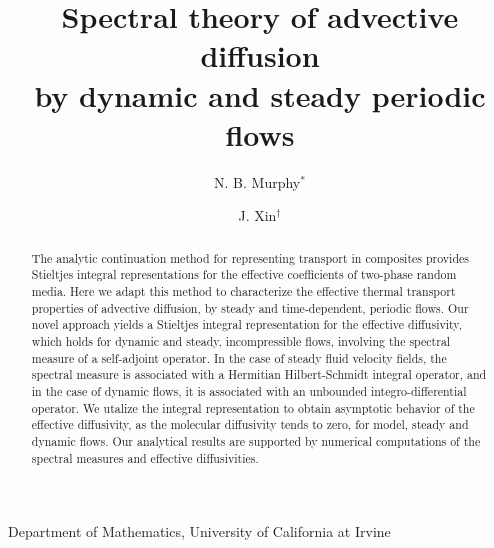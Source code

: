 \documentclass[11pt]{amsart}
\begin{document}
\title{Spectral theory of advective diffusion \\
  by dynamic and steady periodic flows}


\author{N. B. Murphy$^*$}
\address{$^*$Department of Mathematics, 340 Rowland Hall, University of
  California at Irvine, Irvine, CA 92697-3875, USA}

\author{J. Xin$^{\dag}$}
\address{$^{\dag}$Department of Mathematics, 340 Rowland Hall, University of
  California at Irvine, Irvine, CA 92697-3875, USA} 



\maketitle
\vspace{-3ex}
\begin{center}
  Department of Mathematics, University of California at Irvine
\end{center}



\begin{abstract}
%
The analytic continuation method for representing transport in
composites provides Stieltjes integral representations for the
effective coefficients of two-phase random media. Here we adapt this 
method to characterize the effective thermal transport properties of
advective diffusion, by steady and time-dependent, periodic flows. Our
novel approach yields a Stieltjes integral representation for the
effective diffusivity, which holds for dynamic and steady,
incompressible flows, involving the spectral measure of a self-adjoint
operator.
In the case of steady fluid velocity fields, the spectral
measure is associated with a Hermitian Hilbert-Schmidt integral
operator, and in the case of dynamic flows, it is associated with an
unbounded integro-differential operator.
We utalize the integral
representation to obtain asymptotic behavior of the effective
diffusivity, as the molecular diffusivity tends to zero, for model,
steady and dynamic flows. Our analytical results are supported by
numerical computations of the spectral measures and effective
diffusivities.    
%
\end{abstract}
\end{document}
